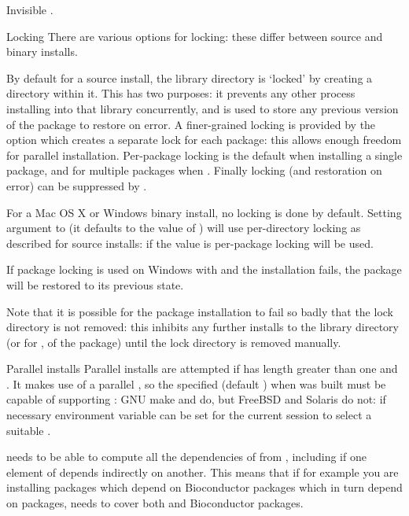 %
\begin{Value}
Invisible .
\end{Value}
%
\begin{Section}{Locking}
There are various options for locking: these differ between source and
binary installs.

By default for a source install, the library directory is
`locked' by creating a directory  within it.  This
has two purposes: it prevents any other process installing into that
library concurrently, and is used to store any previous version of the
package to restore on error.  A finer-grained locking is provided by
the option  which creates a separate lock for each
package: this allows enough freedom for parallel
installation.  Per-package locking is the default when installing a
single package, and for multiple packages when .
Finally locking (and restoration on error) can be suppressed by
.


For a Mac OS X or Windows binary install, no locking is done by
default.  Setting argument  to  (it defaults to
the value of ) will use
per-directory locking as described for source installs: if the value
is  per-package locking will be used.

If package locking is used on Windows with  and
the installation fails, the package will be restored to its previous
state.

Note that it is possible for the package installation to fail so badly
that the lock directory is not removed: this inhibits any further
installs to the library directory (or for , of the
package) until the lock directory is removed manually.
\end{Section}
%
\begin{Section}{Parallel installs}
Parallel installs are attempted if  has length greater than
one and .  It makes use of a parallel ,
so the  specified (default ) when \R{} was
built must be capable of supporting : GNU make
and  do, but FreeBSD and Solaris  do not:
if necessary environment variable  can be set for the
current session to select a suitable .

 needs to be able to compute all the
dependencies of  from , including if one
element of  depends indirectly on another.  This means that
if for example you are installing  packages which depend
on Bioconductor packages which in turn depend on 
packages,  needs to cover both  and
Bioconductor packages.
\end{Section}
